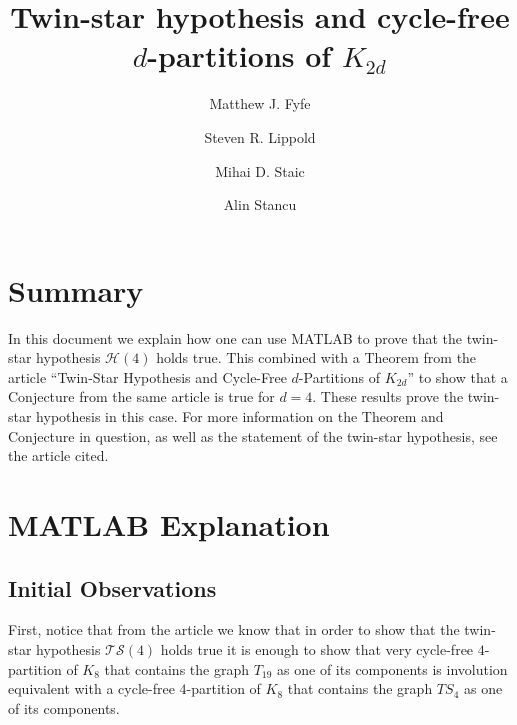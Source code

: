 \documentclass[reqno,11pt]{amsart}
\theoremstyle{definition}
\theoremstyle{remark}
\numberwithin{equation}{section}
\begin{document}
\title[Twin-star hypothesis and cycle-free $d$-partitions of $K_{2d}$ ]{Twin-star hypothesis and cycle-free $d$-partitions of $K_{2d}$  }


\author{Matthew J. Fyfe }
\address{Department of Mathematics and Statistics, Bowling Green State University, Bowling Green, OH 43403 }


\author{Steven R. Lippold}
\address{Department of Chemistry, Mathematics, and Physics, Geneva College, Beaver Falls, PA 15010 }


\author{Mihai D. Staic}
\address{Department of Mathematics and Statistics, Bowling Green State University, Bowling Green, OH 43403 }
\address{Institute of Mathematics of the Romanian Academy, PO.BOX 1-764, RO-70700 Bu\-cha\-rest, Romania.}




\author{Alin Stancu}
\address{Department of Mathematics, Columbus State  University, Columbus, GA 31907}

\maketitle


\section{Summary}
In this document we explain how one can use  MATLAB  to prove that the twin-star hypothesis $\mathcal{H}(4)$ holds true. This combined with a Theorem from the article ``Twin-Star Hypothesis and Cycle-Free $d$-Partitions of $K_{2d}$'' to show that a Conjecture from the same article is true for $d=4$. These results prove the twin-star hypothesis in this case. For more information on the Theorem and Conjecture in question, as well as the statement of the twin-star hypothesis, see the article cited.
\section{MATLAB Explanation}
\subsection{Initial Observations}
First, notice that from the article we know that in order to show that the twin-star hypothesis $\mathcal{TS}(4)$ holds true it is enough to show that very cycle-free $4$-partition of $K_8$ that contains the graph $T_{19}$ as one of its components is involution equivalent with a cycle-free $4$-partition of $K_8$ that contains the graph $TS_4$ as one of its components. 
\end{document}
